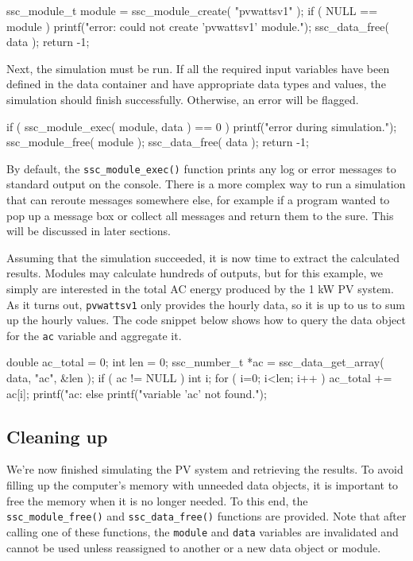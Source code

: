 \documentclass{article}
\begin{document}
\begin{verbatimtab}[4]
	ssc_module_t module = ssc_module_create( "pvwattsv1" );
	if ( NULL == module )
	{
		printf("error: could not create 'pvwattsv1' module.\n");
		ssc_data_free( data );
		return -1;
	}
\end{verbatimtab}

Next, the simulation must be run.  If all the required input variables have been defined in the data container and have appropriate data types and values, the simulation should finish successfully.  Otherwise, an error will be flagged.  

\begin{verbatimtab}[4]
	if ( ssc_module_exec( module, data ) == 0 )
	{
		printf("error during simulation.\n");
		ssc_module_free( module );
		ssc_data_free( data );
		return -1;
	}
\end{verbatimtab}

By default, the \texttt{ssc\_module\_exec()} function prints any log or error messages to standard output on the console.  There is a more complex way to run a simulation that can reroute messages somewhere else, for example if a program wanted to pop up a message box or collect all messages and return them to the sure.  This will be discussed in later sections.

Assuming that the simulation succeeded, it is now time to extract the calculated results.  Modules may calculate hundreds of outputs, but for this example, we simply are interested in the total AC energy produced by the 1 kW PV system.  As it turns out, \texttt{pvwattsv1} only provides the hourly data, so it is up to us to sum up the hourly values.  The code snippet below shows how to query the data object for the \texttt{ac} variable and aggregate it.

\begin{verbatimtab}[4]
	double ac_total = 0;
	int len = 0;
	ssc_number_t *ac = ssc_data_get_array( data, "ac", &len );
	if ( ac != NULL )
	{
		int i;
		for ( i=0; i<len; i++ )
			ac_total += ac[i];
		printf("ac: %
	}
	else
	{
		printf("variable 'ac' not found.\n");
	}
\end{verbatimtab}

\subsection{Cleaning up}

We're now finished simulating the PV system and retrieving the results.  To avoid filling up the computer's memory with unneeded data objects, it is important to free the memory when it is no longer needed.  To this end, the \texttt{ssc\_module\_free()} and \texttt{ssc\_data\_free()} functions are provided.  Note that after calling one of these functions, the \texttt{module} and \texttt{data} variables are invalidated and cannot be used unless reassigned to another or a new data object or module.
\end{document}
